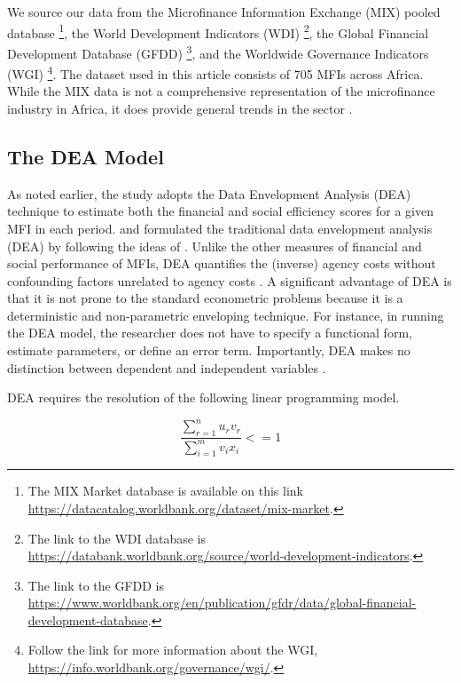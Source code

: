 \documentclass[a4paper, nobind]{templates/ociamthesis}
\begin{document}
We source our data from the Microfinance Information Exchange (MIX) pooled database \footnote{The MIX Market database is available on this link \url{https://datacatalog.worldbank.org/dataset/mix-market}.}, the World Development Indicators (WDI) \footnote{The link to the WDI database is \url{https://databank.worldbank.org/source/world-development-indicators}.}, the Global Financial Development Database (GFDD) \footnote{The link to the GFDD is \url{https://www.worldbank.org/en/publication/gfdr/data/global-financial-development-database}.}, and the Worldwide Governance Indicators (WGI) \footnote{Follow the link for more information about the WGI, \url{https://info.worldbank.org/governance/wgi/}.}. The dataset used in this article consists of 705 MFIs across Africa. While the MIX data is not a comprehensive representation of the microfinance industry in Africa, it does provide general trends in the sector \autocite{jarotschkin2013microfinance}.

\hypertarget{the-dea-model}{%
\subsection{The DEA Model}\label{the-dea-model}}

As noted earlier, the study adopts the Data Envelopment Analysis (DEA) technique to estimate both the financial and social efficiency scores for a given MFI in each period. \textcite{charnes1978measuring} and \textcite{charnes1981evaluating} formulated the traditional data envelopment analysis (DEA) by following the ideas of \textcite{farrel1957measurement}. Unlike the other measures of financial and social performance of MFIs, DEA quantifies the (inverse) agency costs without confounding factors unrelated to agency costs \autocite{berger2006capital}. A significant advantage of DEA is that it is not prone to the standard econometric problems because it is a deterministic and non-parametric enveloping technique. For instance, in running the DEA model, the researcher does not have to specify a functional form, estimate parameters, or define an error term. Importantly, DEA makes no distinction between dependent and independent variables \autocite{zhou2007non}.

DEA requires the resolution of the following linear programming model.

\begin{equation}
\frac{\sum_{r=1}^{n} u_{r}v_{r}}{\sum_{i=1}^{m} v_{i}x_{i}} <= 1
\end{equation}
\end{document}
